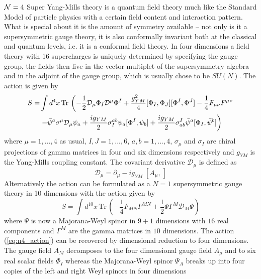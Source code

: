 $\mathcal{N}=4$ Super Yang-Mills theory is a quantum field theory much like the Standard Model of particle physics with a certain field content and interaction pattern. 
What is special about it is the amount of symmetry available -- not only is it a supersymmetric gauge theory, it is also conformally invariant both at the classical and quantum levels, i.e. it is a conformal field theory. 
In four dimensions a field theory with 16 supercharges is uniquely determined by specifying the gauge group, the fields then live in the vector multiplet of the supersymmetry algebra and in the adjoint of the gauge group, which is usually chose to be $SU(N)$. 
The action is given by
\begin{equation}
\begin{split}
S = & \int d^4 x \, \mathrm{Tr} \, \left( -\frac{1}{2} \mathcal{D}_\mu \Phi_I \mathcal{D}^\mu \Phi^I  + \frac{g_{YM}^2}{4} [\Phi_I, \Phi_J] [\Phi^I, \Phi^J] - \frac{1}{4}  F_{\mu\nu} F^{\mu\nu}  \right. \\
	 &\left. - \bar{\psi}^a \sigma^\mu \mathcal{D}_\mu \psi_a  + \frac{ig_{YM}}{2} \sigma^{ab}_I \psi_a [\Phi^I, \psi_b] + \frac{ig_{YM}}{2} \sigma_{ab}^I \bar{\psi}^a [\Phi_I, \bar{\psi}^b] \right)
\end{split}
\label{eq:n4_action}
\end{equation}
where $\mu= 1, ..., 4$ as usual, $I, J = 1, ..., 6$, $a, b = 1, ..., 4$, $\sigma_\mu$ and $\sigma_I$ are chiral projections of gamma matrices in four and six dimensions respectively and $g_{YM}$ is the Yang-Mills coupling constant. 
The covariant derivative $\mathcal{D}_\mu$ is defined as
\begin{equation}
	\mathcal{D}_\mu = \partial_\mu - ig_{YM} \; [A_\mu, \, ]
\end{equation}
Alternatively the action can be formulated as a $N=1$ supersymmetric gauge theory in 10 dimensions with the action given by
\begin{equation}
	S = \int d^{10} x \, \mathrm{Tr} \, \left( -\frac{1}{4}  F_{MN} F^{MN}  + \frac{1}{2} \Psi \Gamma^M \mathcal{D}_M \Psi \right)
\end{equation}
where $\Psi$ is now a Majorana-Weyl spinor in $9+1$ dimensions with $16$ real components and $\Gamma^M$ are the gamma matrices in $10$ dimensions. 
The action (\ref{eq:n4_action}) can be recovered by dimensional reduction to four dimensions. 
The gauge field $A_M$ decomposes to the four dimensional gauge field $A_\mu$ and to six real scalar fields $\Phi_I$ whereas the Majorana-Weyl spinor $\Psi_A$ breaks up into four copies of the left and right Weyl spinors in four dimensions 
